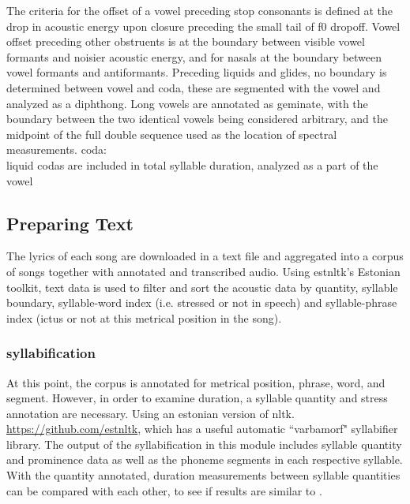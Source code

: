 \documentclass[11pt]{article}
\begin{document}
The criteria for the offset of a vowel preceding stop consonants is defined at the drop in acoustic energy upon closure preceding the small tail of f0 dropoff. Vowel offset preceding other obstruents is at the boundary between visible vowel formants and noisier acoustic energy, and for nasals at the boundary between vowel formants and antiformants. 
Preceding liquids and glides, no boundary is determined between vowel and coda, these are segmented with the vowel and analyzed as a diphthong. 
Long vowels are annotated as geminate, with the boundary between the two identical vowels being considered arbitrary, and the midpoint of the full double sequence used as the location of spectral measurements. 
coda: \\
liquid codas are included in total syllable duration, analyzed as a part of the vowel 

\subsection*{Preparing Text}

The lyrics of each song are downloaded in a text file and aggregated into a corpus of songs together with annotated and transcribed audio. Using estnltk's Estonian toolkit, text data is used to filter and sort the acoustic data by quantity, syllable boundary, syllable-word index (i.e. stressed or not in speech) and syllable-phrase index (ictus or not at this metrical position in the song). 

\subsubsection*{syllabification}

At this point, the corpus is annotated for metrical position, phrase, word, and segment. However, in order to examine duration, a syllable quantity and stress annotation are necessary. Using an estonian version of nltk. \url{https://github.com/estnltk}, which has a useful automatic ``varbamorf"  syllabifier library. The output of the syllabification in this module includes syllable quantity and prominence data as well as the phoneme segments in each respective syllable. With the quantity annotated, duration measurements between syllable quantities can be compared with each other, to see if results are similar to \cite{rossTradeoffQuantityStress1996}.\\
\end{document}
